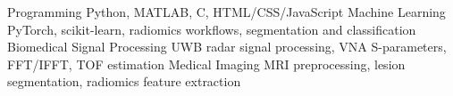 
\begin{skills}
  \skill
    {Programming}
    {Python, MATLAB, C, HTML/CSS/JavaScript}
  \skill
    {Machine Learning}
    {PyTorch, scikit-learn, radiomics workflows, segmentation and classification}
  \skill
    {Biomedical Signal Processing}
    {UWB radar signal processing, VNA S-parameters, FFT/IFFT, TOF estimation}
  \skill
    {Medical Imaging}
    {MRI preprocessing, lesion segmentation, radiomics feature extraction}
\end{skills}
